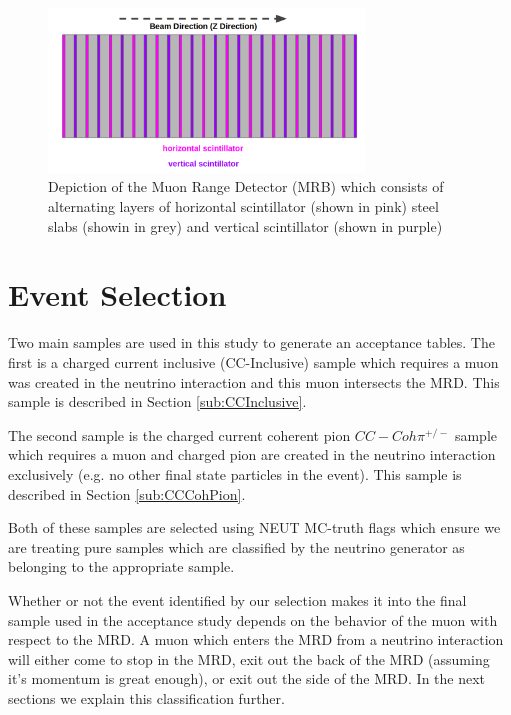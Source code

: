\documentclass[11pt]{article}
\begin{document}
\begin{figure}[H]
\centering
\includegraphics[width=0.75\textwidth]{EventClassifications/mrd.png}
\caption{Depiction of the Muon Range Detector (MRB) which consists of alternating layers of horizontal scintillator (shown in pink) steel slabs (showin in grey) and vertical scintillator (shown in purple)}
\end{figure}\label{fig:mrddetector}



\section{Event Selection}\label{sec:eventselection}
Two main samples are used in this study to generate an acceptance tables. The first is a charged current inclusive (CC-Inclusive) sample which requires a muon was created in the neutrino interaction and this muon intersects the MRD. This sample is described in Section \ref{sub:CCInclusive}.

The second sample is the charged current coherent pion $CC-Coh\pi^{+/-}$ sample which requires a muon and charged pion are created in the neutrino interaction exclusively (e.g. no other final state particles in the event). This sample is described in Section \ref{sub:CCCohPion}.

Both of these samples are selected using NEUT MC-truth flags which ensure we are treating pure samples which are classified by the neutrino generator as belonging to the appropriate sample.

Whether or not the event identified by our selection makes it into the final sample used in the acceptance study depends on the behavior of the muon with respect to the MRD. A muon which enters the MRD from a neutrino interaction will either come to stop in the MRD, exit out the back of the MRD (assuming it's momentum is great enough), or exit out the side of the MRD. In the next sections we explain this classification further.
\end{document}
